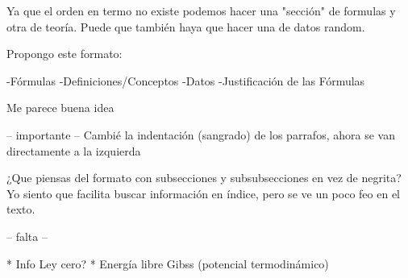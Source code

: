 Ya que el orden en termo no existe podemos hacer una "sección" de formulas y otra de teoría. Puede que también haya que hacer una de datos random.

Propongo este formato:

-Fórmulas
-Definiciones/Conceptos
-Datos
-Justificación de las Fórmulas

Me parece buena idea


-- importante --
Cambié la indentación (sangrado) de los parrafos, ahora se van directamente a la izquierda

¿Que piensas del formato con subsecciones y subsubsecciones en vez de negrita?
Yo siento que facilita buscar información en índice, pero se ve un poco feo en el texto. 

-- falta --

* Info Ley cero?
* Energía libre Gibss (potencial termodinámico)